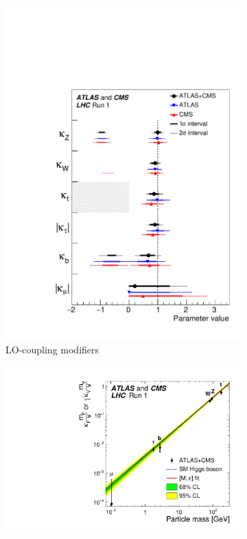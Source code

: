\begin{figure}[htb]
    \centering
    \begin{subfigure}[c]{0.45\textwidth}
        \includegraphics[width=\textwidth]{./figures/theory/coupling_strength.pdf}
        \caption{LO-coupling modifiers}\label{fig:theory:meas:run1:kappanorm}
    \end{subfigure}
    \begin{subfigure}[c]{0.45\textwidth}
        \includegraphics[width=\textwidth]{./figures/theory/reduced_coupling_strength.pdf}

\end{subfigure}
\end{figure}
